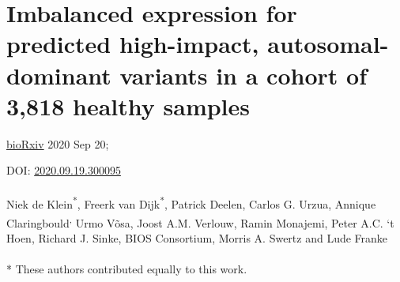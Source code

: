 
\chapterfont{\huge\color{LightOrange}}  %
\sectionfont{\color{LightOrange}}  %
\subsectionfont{\color{LightOrange}}  %

\renewcommand\pcolor{LightOrange}
\renewcommand{\headrule}{\hbox to\headwidth{%
		\color{LightOrange}\leaders\hrule height \headrulewidth\hfill}} %
\fancyfoot[LE,RO]{\thepage}



\cleardoublepage
\makeatletter
\let\savedchap\@makechapterhead
\def\@makechapterhead{\vspace*{-3cm}\savedchap}
\chapter[Imbalanced expression for predicted high-impact, autosomal-dominant variants in a cohort of 3,818 healthy samples]{Imbalanced expression for predicted high-impact, autosomal-dominant variants in a cohort of 3,818 healthy samples}
\chaptermark{}
\let\@makechapterhead\savedchap
\makeatletter
\chaptermark{}

\label{chap:chapter3-ase}


\hfill \underline{bioRxiv} 2020 Sep 20;

\hfill DOI: \href{https://doi.org/10.1101/2020.09.19.300095}{2020.09.19.300095}
\\
\\
Niek de Klein\textsuperscript{*}, Freerk van Dijk\textsuperscript{*}, Patrick Deelen, Carlos G. Urzua, Annique Claringbould\textsuperscript, Urmo Võsa, Joost A.M. Verlouw, Ramin Monajemi, Peter A.C. ‘t Hoen, Richard J. Sinke, BIOS Consortium, Morris A. Swertz and Lude Franke
\\
\\
* These authors contributed equally to this work.

\newpage

{ \Large {} }


